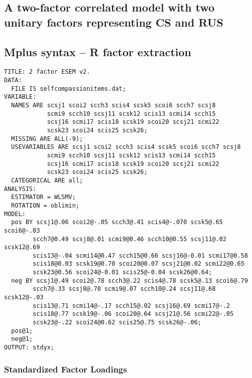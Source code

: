 \begin{appendix}
\newpage

\hypertarget{a-two-factor-correlated-model-with-two-unitary-factors-representing-cs-and-rus-1}{%
\section{A two-factor correlated model with two unitary factors
representing CS and
RUS}\label{a-two-factor-correlated-model-with-two-unitary-factors-representing-cs-and-rus-1}}

\hypertarget{mplus-syntax-r-factor-extraction}{%
\subsection{Mplus syntax -- R factor
extraction}\label{mplus-syntax-r-factor-extraction}}

\begin{verbatim}
TITLE: 2 factor ESEM v2.
DATA:
  FILE IS selfcompassionitems.dat;
VARIABLE:
  NAMES ARE scsj1 scoi2 scch3 scis4 scsk5 scoi6 scch7 scsj8 
            scmi9 scch10 scsj11 scsk12 scis13 scmi14 scch15 
            scsj16 scmi17 scis18 scsk19 scoi20 scsj21 scmi22 
            scsk23 scoi24 scis25 scsk26; 
  MISSING ARE ALL(-9);
  USEVARIABLES ARE scsj1 scoi2 scch3 scis4 scsk5 scoi6 scch7 scsj8 
            scmi9 scch10 scsj11 scsk12 scis13 scmi14 scch15 
            scsj16 scmi17 scis18 scsk19 scoi20 scsj21 scmi22 
            scsk23 scoi24 scis25 scsk26; 
  CATEGORICAL ARE all;
ANALYSIS: 
  ESTIMATOR = WLSMV; 
  ROTATION = oblimin; 
MODEL:
  pos BY scsj1@.06 scoi2@-.05 scch3@.41 scis4@-.070 scsk5@.65 scoi6@-.03 
        scch7@0.49 scsj8@.01 scmi9@0.46 scch10@0.55 scsj11@.02 scsk12@.69 
        scis13@-.04 scmi14@0.47 scch15@0.66 scsj16@-0.01 scmi17@0.58 
        scis18@0.03 scsk19@0.70 scoi20@0.07 scsj21@0.02 scmi22@0.65 
        scsk23@0.56 scoi24@-0.01 scis25@-0.04 scsk26@0.64;
  neg BY scsj1@.49 scoi2@.78 scch3@.22 scis4@.78 scsk5@.13 scoi6@.79 
        scch7@.33 scsj8@.70 scmi9@.07 scch10@.24 scsj11@.68 scsk12@-.03 
        scis13@.71 scmi14@-.17 scch15@.02 scsj16@.69 scmi17@-.2 
        scis18@.77 scsk19@-.06 scoi20@.64 scsj21@.56 scmi22@-.05 
        scsk23@-.22 scoi24@0.62 scis25@.75 scsk26@-.06;
  pos@1;
  neg@1;
OUTPUT: stdyx;
\end{verbatim}

\newpage

\hypertarget{standardized-factor-loadings-1}{%
\subsubsection{Standardized Factor
Loadings}\label{standardized-factor-loadings-1}}


\end{appendix}
